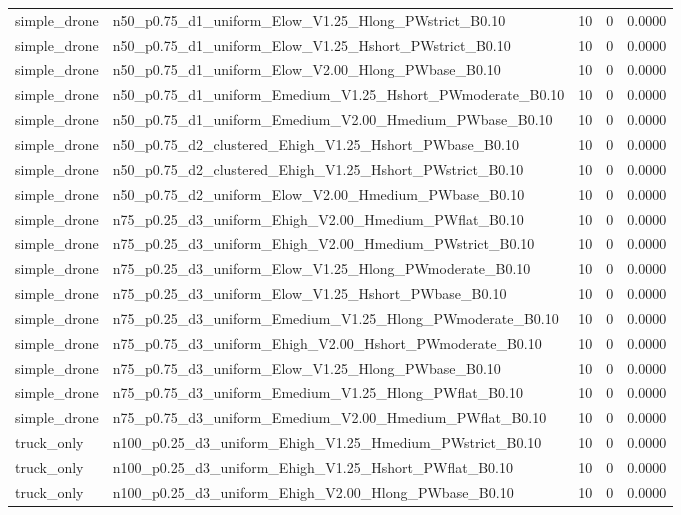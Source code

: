 \begin{tabular}{llrrr}
simple_drone & n50_p0.75_d1_uniform_Elow_V1.25_Hlong_PWstrict_B0.10 & 10 & 0 & 0.0000 \\
simple_drone & n50_p0.75_d1_uniform_Elow_V1.25_Hshort_PWstrict_B0.10 & 10 & 0 & 0.0000 \\
simple_drone & n50_p0.75_d1_uniform_Elow_V2.00_Hlong_PWbase_B0.10 & 10 & 0 & 0.0000 \\
simple_drone & n50_p0.75_d1_uniform_Emedium_V1.25_Hshort_PWmoderate_B0.10 & 10 & 0 & 0.0000 \\
simple_drone & n50_p0.75_d1_uniform_Emedium_V2.00_Hmedium_PWbase_B0.10 & 10 & 0 & 0.0000 \\
simple_drone & n50_p0.75_d2_clustered_Ehigh_V1.25_Hshort_PWbase_B0.10 & 10 & 0 & 0.0000 \\
simple_drone & n50_p0.75_d2_clustered_Ehigh_V1.25_Hshort_PWstrict_B0.10 & 10 & 0 & 0.0000 \\
simple_drone & n50_p0.75_d2_uniform_Elow_V2.00_Hmedium_PWbase_B0.10 & 10 & 0 & 0.0000 \\
simple_drone & n75_p0.25_d3_uniform_Ehigh_V2.00_Hmedium_PWflat_B0.10 & 10 & 0 & 0.0000 \\
simple_drone & n75_p0.25_d3_uniform_Ehigh_V2.00_Hmedium_PWstrict_B0.10 & 10 & 0 & 0.0000 \\
simple_drone & n75_p0.25_d3_uniform_Elow_V1.25_Hlong_PWmoderate_B0.10 & 10 & 0 & 0.0000 \\
simple_drone & n75_p0.25_d3_uniform_Elow_V1.25_Hshort_PWbase_B0.10 & 10 & 0 & 0.0000 \\
simple_drone & n75_p0.25_d3_uniform_Emedium_V1.25_Hlong_PWmoderate_B0.10 & 10 & 0 & 0.0000 \\
simple_drone & n75_p0.75_d3_uniform_Ehigh_V2.00_Hshort_PWmoderate_B0.10 & 10 & 0 & 0.0000 \\
simple_drone & n75_p0.75_d3_uniform_Elow_V1.25_Hlong_PWbase_B0.10 & 10 & 0 & 0.0000 \\
simple_drone & n75_p0.75_d3_uniform_Emedium_V1.25_Hlong_PWflat_B0.10 & 10 & 0 & 0.0000 \\
simple_drone & n75_p0.75_d3_uniform_Emedium_V2.00_Hmedium_PWflat_B0.10 & 10 & 0 & 0.0000 \\
truck_only & n100_p0.25_d3_uniform_Ehigh_V1.25_Hmedium_PWstrict_B0.10 & 10 & 0 & 0.0000 \\
truck_only & n100_p0.25_d3_uniform_Ehigh_V1.25_Hshort_PWflat_B0.10 & 10 & 0 & 0.0000 \\
truck_only & n100_p0.25_d3_uniform_Ehigh_V2.00_Hlong_PWbase_B0.10 & 10 & 0 & 0.0000 \\

\end{tabular}
